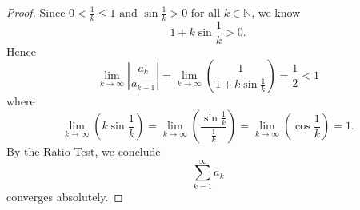 \begin{Exercise}
\begin{proof}
Since $0<\frac{1}{k}\leq1 \mbox{ and } \sin{\frac{1}{k}} > 0$ for all $k\in\mathbb{N}$, we know $$ 1+k\sin{\frac{1}{k}} > 0.$$
Hence $$ \lim_{k\to\infty}\left|\frac{a_k}{a_{k-1}}\right| = \lim_{k\to\infty}\left(\frac{1}{1+k\sin{\frac{1}{k}}}\right) = \frac{1}{2} < 1 $$ where $$ \lim_{k\to\infty}\left(k\sin{\frac{1}{k}}\right) = \lim_{k\to\infty}\left(\frac{\sin{\frac{1}{k}}}{\frac{1}{k}}\right) = \lim_{k\to\infty}\left(\cos{\frac{1}{k}}\right) = 1.$$
By the Ratio Test, we conclude $$\sum_{k=1}^{\infty}a_k$$ converges absolutely.
\end{proof}
\end{Exercise}
